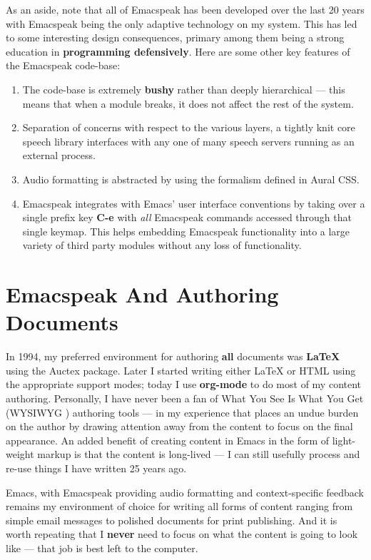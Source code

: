 \documentclass[11pt]{article}
\begin{document}
As an aside, note that all of Emacspeak has been developed over
the last 20 years with Emacspeak being the only adaptive
technology on my system. This has led to  some interesting design
consequences, primary among them being  a strong education in
\textbf{programming defensively}.  Here are some other key features of
the Emacspeak code-base:

\begin{enumerate}
\item The code-base is extremely \textbf{bushy} rather than deeply
hierarchical — this means that when a module breaks, it does
not affect the rest of the system.
\item Separation of concerns with respect to the various layers, a
tightly knit  core speech library  interfaces  with  any one
of many  speech servers  running as an external process.
\item Audio formatting is abstracted by using the formalism
defined in Aural CSS.
\item Emacspeak integrates with Emacs' user interface conventions
by taking over a single prefix key \textbf{C-e} with \emph{all}
Emacspeak commands accessed through that single keymap.
This helps embedding Emacspeak functionality into a large
variety of third party modules without any loss of functionality.
\end{enumerate}


\section{Emacspeak And Authoring Documents}
\label{sec-6}

In 1994, my preferred environment for authoring \textbf{all} documents
was \textbf{\LaTeX{}} using the Auctex package. Later I started writing
either \LaTeX{} or HTML using the appropriate support modes; today I
use \textbf{org-mode} to do most of my content authoring. Personally, I
have never been a fan of What You See Is What You Get (WYSIWYG )
authoring tools — in my experience that places an undue burden on
the author by drawing attention away from the content to focus on
the final appearance. An added benefit of creating content in
Emacs in the form of light-weight markup is that the content is
long-lived — I can still usefully process and re-use things I
have written 25 years ago.

Emacs, with Emacspeak providing audio formatting and
context-specific feedback remains my environment of choice for
writing all forms of content ranging from simple email messages
to polished documents for print publishing. And it is worth
repeating that I \textbf{never} need to focus on what the content is
going to look like — that job is best left to the computer.
\end{document}
